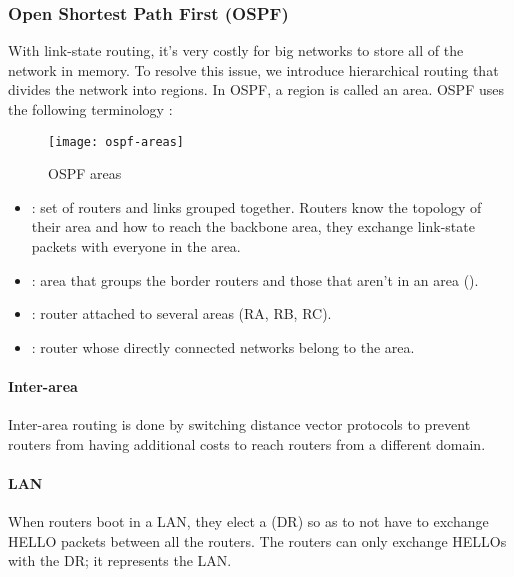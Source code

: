 \subsubsection[OSPF]{Open Shortest Path First (OSPF)}

With link-state routing, it’s very costly for big networks to store all of the network in memory. To resolve this issue, we introduce hierarchical routing that divides the network into regions. In OSPF, a region is called an area.
OSPF uses the following terminology :

\begin{minipage}{0.38\textwidth}
	\begin{figure}[H]
		\centering
		\texttt{[image: ospf-areas]}
		\caption{OSPF areas}
	\end{figure}
\end{minipage}
\begin{minipage}{0.61\textwidth}
	\begin{itemize}
	\item {} : set of routers and links grouped together. Routers know the topology of their area and how to reach the backbone area, they exchange link-state packets with everyone in the area.
	\item {} : area that groups the border routers and those that aren’t in an area ().
	\item {} : router attached to several areas (RA, RB, RC).
	\item {} : router whose directly connected networks belong to the area.
	\end{itemize}
\end{minipage}

\paragraph*{Inter-area}

Inter-area routing is done by switching distance vector protocols to prevent routers from having additional costs to reach routers from a different domain.

\paragraph*{LAN}

When routers boot in a LAN, they elect a  (DR) so as to not have to exchange HELLO packets between all the routers. The routers can only exchange HELLOs with the DR; it represents the LAN.

